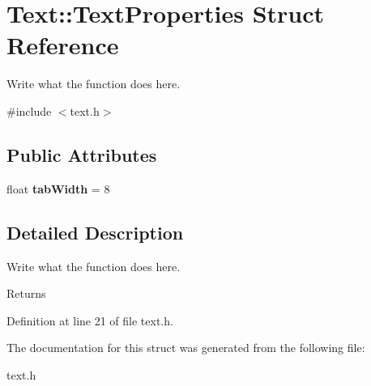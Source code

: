\hypertarget{structText_1_1TextProperties}{\section{Text\+:\+:Text\+Properties Struct Reference}
\label{structText_1_1TextProperties}
}


Write what the function does here.  




{\ttfamily \#include $<$text.\+h$>$}

\subsection*{Public Attributes}
\begin{DoxyCompactItemize}
\item 
\hypertarget{structText_1_1TextProperties_a44233dc1053dea188f86428a2768b46c}{float {\bfseries tab\+Width} = 8}\label{structText_1_1TextProperties_a44233dc1053dea188f86428a2768b46c}

\end{DoxyCompactItemize}


\subsection{Detailed Description}
Write what the function does here. 

\begin{DoxyReturn}{Returns}

\end{DoxyReturn}


Definition at line 21 of file text.\+h.



The documentation for this struct was generated from the following file\+:\begin{DoxyCompactItemize}
\item 
text.\+h\end{DoxyCompactItemize}
